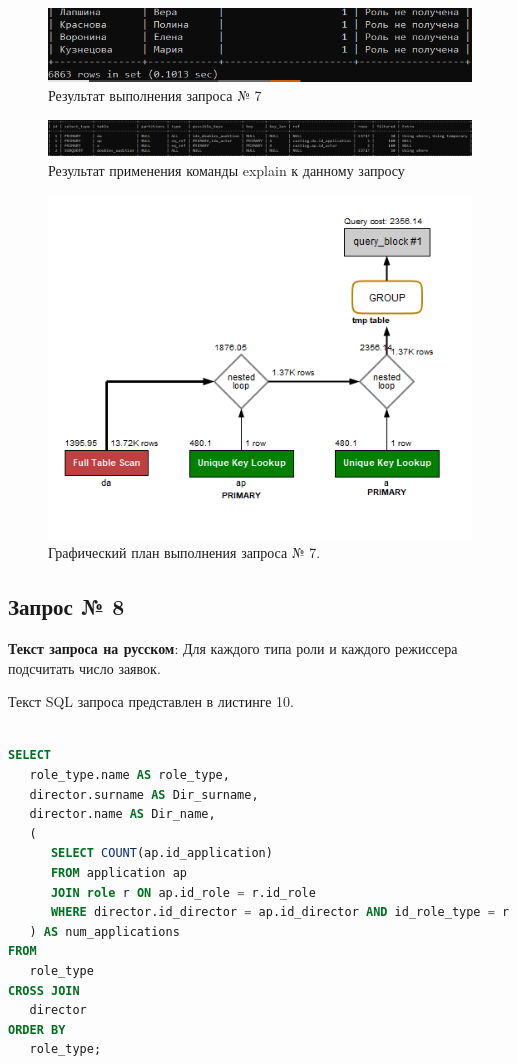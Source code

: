 \documentclass[11pt,a4paper,final]{article} %
\begin{document}
\begin{figure}[H]
	\centering
	\includegraphics[width=0.7\linewidth]{72.png}
	\caption{Результат выполнения запроса № 7}
	\label{fig:72}
\end{figure}

\begin{figure}[H]
	\centering
	\includegraphics[width=1.0\linewidth]{e7.png}
	\caption{Результат применения команды explain к данному запросу}
	\label{fig:e7}
\end{figure}

\begin{figure}[H]
	\centering
	\includegraphics[width=0.55\linewidth]{ex7.png}
	\caption{Графический план выполнения запроса № 7.}
	\label{fig:ex7}
\end{figure}

\subsection{Запрос № 8}

\par \textbf{Текст запроса на русском}: Для каждого типа роли и каждого режиссера подсчитать число заявок.
\par Текст SQL запроса представлен в листинге 10.

\begin{lstlisting}[caption=SQL запрос № 8, language=SQL]

SELECT 
   role_type.name AS role_type, 
   director.surname AS Dir_surname, 
   director.name AS Dir_name,
   (  
      SELECT COUNT(ap.id_application)
      FROM application ap
      JOIN role r ON ap.id_role = r.id_role
      WHERE director.id_director = ap.id_director AND id_role_type = r.id_role_type
   ) AS num_applications
FROM
   role_type
CROSS JOIN
   director
ORDER BY
   role_type;    	
	
\end{lstlisting}
\end{document}
